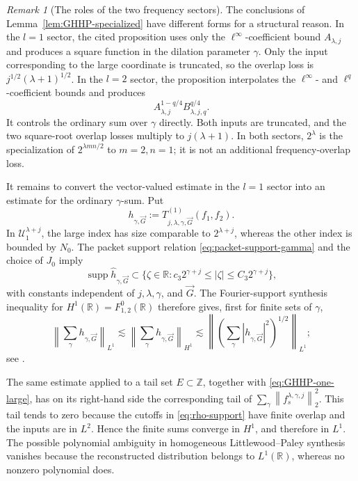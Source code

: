 \documentclass[11pt]{amsart}
\theoremstyle{remark}
\newtheorem{remark}[definition]{Remark}
\numberwithin{equation}{section}
\newcommand{\R}{\mathbb R}
\newcommand{\cU}{\mathcal U}
\newcommand{\norm}[1]{\left\lVert #1\right\rVert}
\newcommand{\supp}{\operatorname{supp}}
\begin{document}
	\begin{remark}[The roles of the two frequency sectors]
		\label{rem:GHHP-bookkeeping}
		The conclusions of Lemma~\ref{lem:GHHP-specialized} have different forms
		for a structural reason. In the \(l=1\) sector, the cited proposition uses
		only the \(\ell^\infty\)-coefficient bound \(A_{\lambda,j}\) and produces
		a square function in the dilation parameter \(\gamma\). Only the input
		corresponding to the large coordinate is truncated, so the overlap loss is
		\(j^{1/2}(\lambda+1)^{1/2}\). In the \(l=2\) sector, the proposition
		interpolates the \(\ell^\infty\)- and \(\ell^q\)-coefficient bounds and
		produces
		\[
		A_{\lambda,j}^{1-q/4}B_{\lambda,j,q}^{q/4}.
		\]
		It controls the ordinary sum over \(\gamma\) directly. Both inputs are
		truncated, and the two square-root overlap losses multiply to
		\(j(\lambda+1)\). In both sectors, \(2^\lambda\) is the specialization of
		\(2^{\lambda mn/2}\) to \(m=2,n=1\); it is not an additional
		frequency-overlap loss.
	\end{remark}
	
	It remains to convert the vector-valued estimate in the \(l=1\) sector
	into an estimate for the ordinary \(\gamma\)-sum. Put
	\[
	h_{\gamma,\vec G}
	:=T_{j,\lambda,\gamma,\vec G}^{(1)}(f_1,f_2).
	\]
	In \(\cU_1^{\lambda+j}\), the large index has size comparable to
	\(2^{\lambda+j}\), whereas the other index is bounded by \(N_0\).
	The packet support relation \eqref{eq:packet-support-gamma} and the choice
	of \(J_0\) imply
	\begin{equation}
		\supp\widehat h_{\gamma,\vec G}
		\subset
		\{\zeta\in\R:
		c_3 2^{\gamma+j}\le|\zeta|\le C_3 2^{\gamma+j}\},
		\label{eq:unbal-output-annulus}
	\end{equation}
	with constants independent of \(j,\lambda,\gamma\), and \(\vec G\).
	The Fourier-support synthesis inequality for
	\(H^1(\R)=F^0_{1,2}(\R)\) therefore gives, first for finite sets of
	\(\gamma\),
	\[
	\left\|\sum_\gamma h_{\gamma,\vec G}\right\|_{L^1}
	\lesssim
	\left\|\sum_\gamma h_{\gamma,\vec G}\right\|_{H^1}
	\lesssim
	\left\|
	\left(\sum_\gamma|h_{\gamma,\vec G}|^2\right)^{1/2}
	\right\|_{L^1};
	\]
	see \cite[Chapter~1]{Triebel_2006}.
	
	The same estimate applied to a tail set \(E\subset\mathbb Z\), together
	with \eqref{eq:GHHP-one-large}, has on its right-hand side the corresponding
	tail of
	\(\sum_\gamma\norm{f_s^{\lambda,\gamma,j}}_2^2\). This tail tends to zero
	because the cutoffs in \eqref{eq:rho-support} have finite overlap and the
	inputs are in \(L^2\). Hence the finite sums converge in \(H^1\), and
	therefore in \(L^1\). The possible polynomial ambiguity in homogeneous
	Littlewood--Paley synthesis vanishes because the reconstructed distribution
	belongs to \(L^1(\R)\), whereas no nonzero polynomial does.
	
\end{document}
